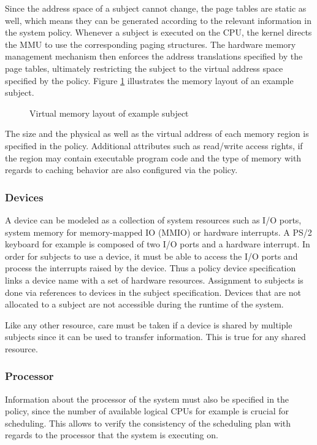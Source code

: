 Since the address space of a subject cannot change, the page tables are static
as well, which means they can be generated according to the relevant information
in the system policy. Whenever a subject is executed on the CPU, the kernel
directs the MMU to use the corresponding paging structures. The hardware memory
management mechanism then enforces the address translations specified by the
page tables, ultimately restricting the subject to the virtual address space
specified by the policy. Figure \ref{fig:virt-mem-layout-example} illustrates
the memory layout of an example subject.

\begin{figure}[h]
	\centering
	
	\caption{Virtual memory layout of example subject}
	\label{fig:virt-mem-layout-example}
\end{figure}

The size and the physical as well as the virtual address of each memory region
is specified in the policy. Additional attributes such as read/write access
rights, if the region may contain executable program code and the type of memory
with regards to caching behavior are also configured via the policy.

\subsubsection{Devices}
A device can be modeled as a collection of system resources such as I/O ports,
system memory for memory-mapped IO (MMIO) or hardware interrupts. A PS/2
keyboard for example is composed of two I/O ports and a hardware interrupt.
In order for subjects to use a device, it must be able to access the I/O ports
and process the interrupts raised by the device. Thus a policy device
specification links a device name with a set of hardware resources. Assignment
to subjects is done via references to devices in the subject specification.
Devices that are not allocated to a subject are not accessible during the
runtime of the system.

Like any other resource, care must be taken if a device is shared by multiple
subjects since it can be used to transfer information. This is true for any
shared resource.

\subsubsection{Processor}
Information about the processor of the system must also be specified in the
policy, since the number of available logical CPUs for example is crucial for
scheduling. This allows to verify the consistency of the scheduling plan with
regards to the processor that the system is executing on.

